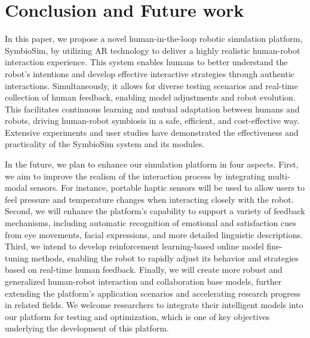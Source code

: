 \section{Conclusion and Future work}
\label{sec:conclusion}

In this paper, we propose a novel human-in-the-loop robotic simulation platform, SymbioSim, by utilizing AR technology to deliver a highly realistic human-robot interaction experience. This system enables humans to better understand the robot’s intentions and develop effective interactive strategies through authentic interactions. Simultaneously, it allows for diverse testing scenarios and real-time collection of human feedback, enabling model adjustments and robot evolution. This facilitates continuous learning and mutual adaptation between humans and robots, driving human-robot symbiosis in a safe, efficient, and cost-effective way. Extensive experiments and user studies have demonstrated the effectiveness and practicality of the SymbioSim system and its modules. 

In the future, we plan to enhance our simulation platform in four aspects. First, we aim to improve the realism of the interaction process by integrating multi-modal sensors. For instance, portable haptic sensors will be used to allow users to feel pressure and temperature changes when interacting closely with the robot. Second, we will enhance the platform's capability to support a variety of feedback mechanisms, including automatic recognition of emotional and satisfaction cues from eye movements, facial expressions, and more detailed linguistic descriptions. Third, we intend to develop reinforcement learning-based online model fine-tuning methods, enabling the robot to rapidly adjust its behavior and strategies based on real-time human feedback. Finally, we will create more robust and generalized human-robot interaction and collaboration base models, further extending the platform's application scenarios and accelerating research progress in related fields. We welcome researchers to integrate their intelligent models into our platform for testing and optimization, which is one of key objectives underlying the development of this platform.



